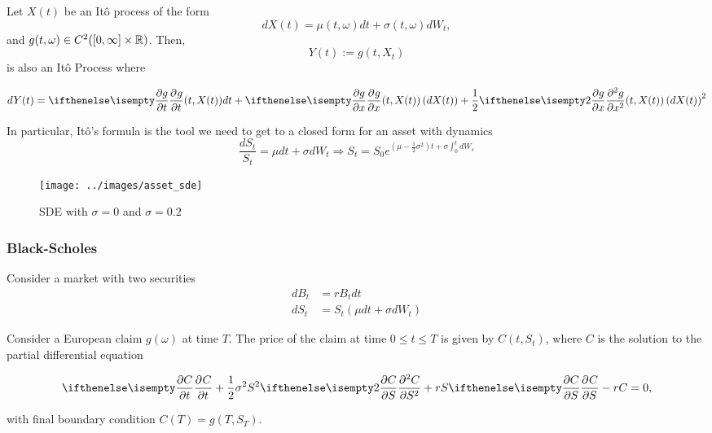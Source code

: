 \documentclass{beamer}
\begin{document}
\begin{frame}
\begin{theorem}\label{th:itos_formula}
	Let $X(t)$ be an It\^o process of the form
	\[
		dX(t) = \mu(t, \omega) dt + \sigma(t, \omega) dW_t,
	\]
	and $g(t, \omega) \in C^2([0, \infty]\times\mathbb{R})$. Then,
	\begin{equation*}
		Y(t) := g(t, X_t)
	\end{equation*}
	is also an It\^o Process where
	
	\begin{equation*}
		dY(t) = \partialwrt{g}{t}(t, X(t)) dt + \partialwrt{g}{x}(t, X(t)) \left(dX(t)\right) + \frac{1}{2}\partialwrt[2]{g}{x} (t, X(t)) \left(dX(t)\right)^2
	\end{equation*}	
\end{theorem}	
\end{frame}

\begin{frame}
In particular, It\^o's formula is the tool we need to get to a closed form for an asset with dynamics
	\[
	\frac{dS_t}{S_t} = \mu dt + \sigma dW_t \Rightarrow S_t = S_0e^{\left(\mu - \frac{1}{2}\sigma^2\right) t + \sigma\int_0^t dW_s}
	\]
	
\begin{figure}[hbt]
  \texttt{[image: ../images/asset\_sde]}
  \caption{SDE with $\sigma=0$ and $\sigma=0.2$}
\end{figure}
\end{frame}

\begin{frame}
	\frametitle{Black-Scholes}
	Consider a market with two securities
	\begin{align*}
	dB_t &= r B_t dt \\
	dS_t &= S_t(\mu dt + \sigma dW_t)
	\end{align*}
	
\begin{theorem}
	Consider a European claim $g(\omega)$ at time $T$. The price of the claim at time $0\leq t\leq T$ is given by $C(t,S_t)$, where $C$ is the solution to the partial differential equation
	
	\begin{equation}\label{eq:black-scholes-formula}
		\partialwrt{C}{t} + \frac{1}{2}\sigma^2S^2\partialwrt[2]{C}{S} + rS\partialwrt{C}{S} - rC = 0,
	\end{equation}

with final boundary condition $C(T) = g(T, S_T)$.
\end{theorem}
\end{frame}
\end{document}
